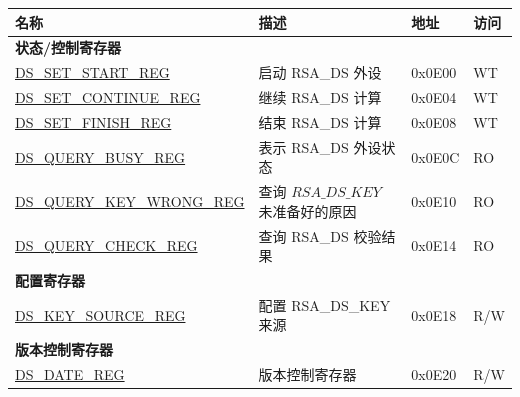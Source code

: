 \begin{longtable}{ | p{6cm} | p{7.2cm} | p{1.3cm} | p{1cm} | }
\hline\rowcolor{lightgray}
\textbf{名称} & \textbf{描述} &  \textbf{地址} & \textbf{访问} \\ \hline
\endhead
\multicolumn{4}{|l|}{\textbf{状态/控制寄存器}} \\ \hline
\hyperref[regdesc:DSSETSTARTREG]{DS\_SET\_START\_REG} & 启动 RSA\_DS 外设 & 0x0E00 & WT \\ \hline
\hyperref[regdesc:DSSETCONTINUEREG]{DS\_SET\_CONTINUE\_REG} & 继续 RSA\_DS 计算 & 0x0E04 & WT \\ \hline
\hyperref[regdesc:DSSETFINISHREG]{DS\_SET\_FINISH\_REG} & 结束 RSA\_DS 计算 & 0x0E08 & WT \\ \hline
\hyperref[regdesc:DSQUERYBUSYREG]{DS\_QUERY\_BUSY\_REG} & 表示 RSA\_DS 外设状态 & 0x0E0C & RO \\ \hline
\hyperref[regdesc:DSQUERYKEYWRONGREG]{DS\_QUERY\_KEY\_WRONG\_REG} & 查询 \begin{math}RSA\_DS\_KEY\end{math} 未准备好的原因 & 0x0E10 & RO \\ \hline
\hyperref[regdesc:DSQUERYCHECKREG]{DS\_QUERY\_CHECK\_REG} & 查询 RSA\_DS 校验结果 & 0x0E14 & RO \\ \hline
\multicolumn{4}{|l|}{\textbf{配置寄存器}} \\ \hline
\hyperref[regdesc:DSKEYSOURCEREG]{DS\_KEY\_SOURCE\_REG} & 配置 RSA\_DS\_KEY 来源 & 0x0E18 & R/W \\ \hline
\multicolumn{4}{|l|}{\textbf{版本控制寄存器}} \\ \hline
\hyperref[regdesc:DSDATEREG]{DS\_DATE\_REG} & 版本控制寄存器 & 0x0E20 & R/W \\ \hline
\end{longtable}